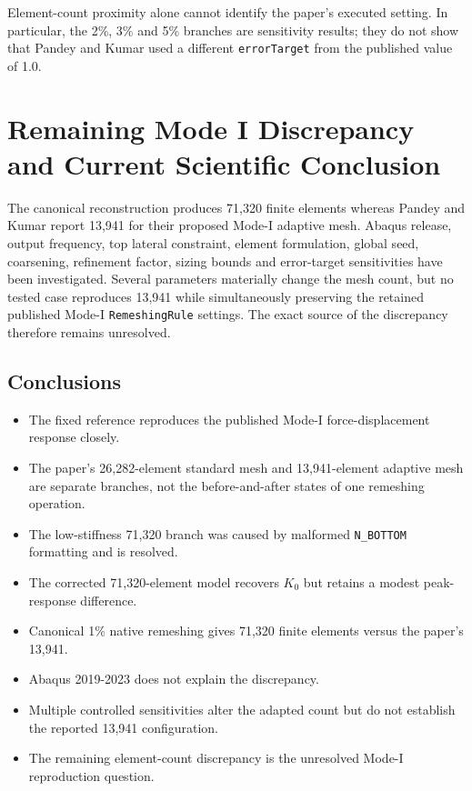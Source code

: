 \documentclass[10pt,a4paper]{article}
\begin{document}
{\small Element-count proximity alone cannot identify the paper's executed setting. In particular, the 2\%, 3\% and 5\% branches are sensitivity results; they do not show that Pandey and Kumar used a different \texttt{errorTarget} from the published value of 1.0.}

\newpage
\section{Remaining Mode I Discrepancy and Current Scientific Conclusion}
The canonical reconstruction produces 71,320 finite elements whereas Pandey and Kumar report 13,941 for their proposed Mode-I adaptive mesh. Abaqus release, output frequency, top lateral constraint, element formulation, global seed, coarsening, refinement factor, sizing bounds and error-target sensitivities have been investigated. Several parameters materially change the mesh count, but no tested case reproduces 13,941 while simultaneously preserving the retained published Mode-I \texttt{RemeshingRule} settings. The exact source of the discrepancy therefore remains unresolved.

\subsection{Conclusions}
\begin{itemize}
\item The fixed reference reproduces the published Mode-I force-displacement response closely.
\item The paper's 26,282-element standard mesh and 13,941-element adaptive mesh are separate branches, not the before-and-after states of one remeshing operation.
\item The low-stiffness 71,320 branch was caused by malformed \texttt{N\_BOTTOM} formatting and is resolved.
\item The corrected 71,320-element model recovers $K_0$ but retains a modest peak-response difference.
\item Canonical 1\% native remeshing gives 71,320 finite elements versus the paper's 13,941.
\item Abaqus 2019-2023 does not explain the discrepancy.
\item Multiple controlled sensitivities alter the adapted count but do not establish the reported 13,941 configuration.
\item The remaining element-count discrepancy is the unresolved Mode-I reproduction question.
\end{itemize}
\end{document}
